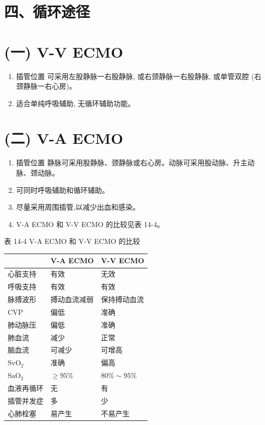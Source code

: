 \documentclass[10pt]{article}
\begin{document}
\section*{四、循环途径}
\section*{(一) V-V ECMO}
\begin{enumerate}
  \item 插管位置 可采用左股静脉一右股静脉, 或右颈静脉一右股静脉, 或单管双腔 (右颈静脉一右心房)。

  \item 适合单纯呼吸辅助, 无循环辅助功能。

\end{enumerate}

\section*{(二) V-A ECMO}
\begin{enumerate}
  \item 插管位置 静脉可采用股静脉、颈静脉或右心房。动脉可采用股动脉、升主动脉、颈动脉。

  \item 可同时呼吸辅助和循环辅助。

  \item 尽量采用周围插管,以减少出血和感染。

  \item V-A ECMO 和 V-V ECMO 的比较见表 14-4。

\end{enumerate}

表 14-4 V-A ECMO 和 V-V ECMO 的比较

\begin{center}
\begin{tabular}{lll}
\hline
 & V-A ECMO & V-V ECMO \\
\hline
心脏支持 & 有效 & 无效 \\
呼吸支持 & 有效 & 有效 \\
脉搏波形 & 搏动血流减弱 & 保持搏动血流 \\
$\mathrm{CVP}$ & 偏低 & 准确 \\
肺动脉压 & 偏低 & 准确 \\
肺血流 & 减少 & 正常 \\
脑血流 & 可减少 & 可增高 \\
$\mathrm{SvO}_{2}$ & 准确 & 偏高 \\
$\mathrm{SaO}_{2}$ & $\geqslant 95 \%$ & $80 \% \sim 95 \%$ \\
血液再循环 & 无 & 有 \\
插管并发症 & 多 & 少 \\
心肺栓塞 & 易产生 & 不易产生 \\
\hline
\end{tabular}
\end{center}
\end{document}
